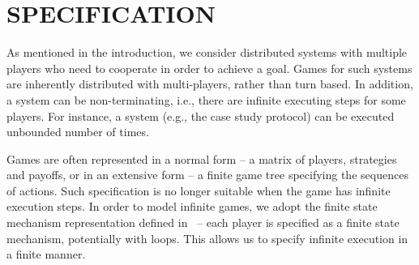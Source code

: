 \section{SPECIFICATION}
\label{sec:mech} 


As mentioned in the introduction, we consider distributed systems with multiple players who need to cooperate in order to achieve a goal. Games for such systems are inherently distributed with multi-players, rather than turn based. In addition, a system can be non-terminating, i.e., there are infinite executing steps for some players. For instance, a system (e.g., the case study protocol) can be executed unbounded number of times.

Games are often represented in a normal form -- a matrix of players, strategies and payoffs, or in an extensive form -- a finite game tree specifying the sequences of actions. Such specification is no longer suitable when the game has infinite execution steps. In order to model infinite games, we adopt the finite state mechanism representation defined in~\cite{MMS08} -- each player is specified as a finite state mechanism, potentially with loops. This allows us to specify infinite execution in a finite manner.


